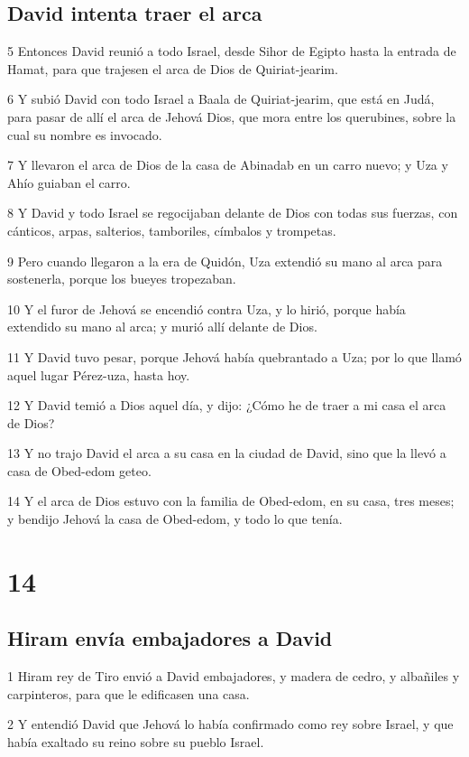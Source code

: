 \section*{David intenta traer el arca}

\par 5 Entonces David reunió a todo Israel, desde Sihor de Egipto hasta la entrada de Hamat, para que trajesen el arca de Dios de Quiriat-jearim. 
\par 6 Y subió David con todo Israel a Baala de Quiriat-jearim, que está en Judá, para pasar de allí el arca de Jehová Dios, que mora entre los querubines, sobre la cual su nombre es invocado.
\par 7 Y llevaron el arca de Dios de la casa de Abinadab en un carro nuevo; y Uza y Ahío guiaban el carro.
\par 8 Y David y todo Israel se regocijaban delante de Dios con todas sus fuerzas, con cánticos, arpas, salterios, tamboriles, címbalos y trompetas.
\par 9 Pero cuando llegaron a la era de Quidón, Uza extendió su mano al arca para sostenerla, porque los bueyes tropezaban.
\par 10 Y el furor de Jehová se encendió contra Uza, y lo hirió, porque había extendido su mano al arca; y murió allí delante de Dios.
\par 11 Y David tuvo pesar, porque Jehová había quebrantado a Uza; por lo que llamó aquel lugar Pérez-uza, hasta hoy.
\par 12 Y David temió a Dios aquel día, y dijo: ¿Cómo he de traer a mi casa el arca de Dios?
\par 13 Y no trajo David el arca a su casa en la ciudad de David, sino que la llevó a casa de Obed-edom geteo.
\par 14 Y el arca de Dios estuvo con la familia de Obed-edom, en su casa, tres meses; y bendijo Jehová la casa de Obed-edom, y todo lo que tenía.

\chapter{14}

\section*{Hiram envía embajadores a David}

\par 1 Hiram rey de Tiro envió a David embajadores, y madera de cedro, y albañiles y carpinteros, para que le edificasen una casa.
\par 2 Y entendió David que Jehová lo había confirmado como rey sobre Israel, y que había exaltado su reino sobre su pueblo Israel.

